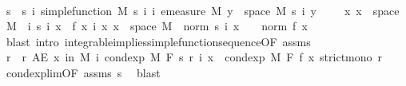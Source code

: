 \begin{isabellebody}
%
\isadelimproof
%
\endisadelimproof
%
\isatagproof
{}\isamarkupfalse%
\ {\isacharminus}{\kern0pt}\isanewline
\ \ \isamarkupfalse%
\ s\ \ s{\isacharcolon}{\kern0pt}\ {\isachardoublequoteopen}{\isasymAnd}i{\isachardot}{\kern0pt}\ simple{\isacharunderscore}{\kern0pt}function\ M\ {\isacharparenleft}{\kern0pt}s\ i{\isacharparenright}{\kern0pt}{\isachardoublequoteclose}\ {\isachardoublequoteopen}{\isasymAnd}i{\isachardot}{\kern0pt}\ emeasure\ M\ {\isacharbraceleft}{\kern0pt}y\ {\isasymin}\ space\ M{\isachardot}{\kern0pt}\ s\ i\ y\ {\isasymnoteq}\ {}{\isacharbraceright}{\kern0pt}\ {\isasymnoteq}\ {\isasyminfinity}{\isachardoublequoteclose}\ {\isachardoublequoteopen}{\isasymAnd}x{\isachardot}{\kern0pt}\ x\ {\isasymin}\ space\ M\ {\isasymLongrightarrow}\ {\isacharparenleft}{\kern0pt}{\isasymlambda}i{\isachardot}{\kern0pt}\ s\ i\ x{\isacharparenright}{\kern0pt}\ {\isasymlonglonglongrightarrow}\ f\ x{\isachardoublequoteclose}\ {\isachardoublequoteopen}{\isasymAnd}i\ x{\isachardot}{\kern0pt}\ x\ {\isasymin}\ space\ M\ {\isasymLongrightarrow}\ norm\ {\isacharparenleft}{\kern0pt}s\ i\ x{\isacharparenright}{\kern0pt}\ {\isasymle}\ {}\ {\isacharasterisk}{\kern0pt}\ norm\ {\isacharparenleft}{\kern0pt}f\ x{\isacharparenright}{\kern0pt}{\isachardoublequoteclose}\ \isanewline
\ \ \ \ \isamarkupfalse%
\ {\isacharparenleft}{\kern0pt}blast\ intro{\isacharcolon}{\kern0pt}\ integrable{\isacharunderscore}{\kern0pt}implies{\isacharunderscore}{\kern0pt}simple{\isacharunderscore}{\kern0pt}function{\isacharunderscore}{\kern0pt}sequence{\isacharbrackleft}{\kern0pt}OF\ assms{\isacharbrackright}{\kern0pt}{\isacharparenright}{\kern0pt}\isanewline
\isanewline
\ \ \isamarkupfalse%
\ r\ \ r{\isacharcolon}{\kern0pt}\ {\isachardoublequoteopen}AE\ x\ in\ M{\isachardot}{\kern0pt}\ {\isacharparenleft}{\kern0pt}{\isasymlambda}i{\isachardot}{\kern0pt}\ cond{\isacharunderscore}{\kern0pt}exp\ M\ F\ {\isacharparenleft}{\kern0pt}s\ {\isacharparenleft}{\kern0pt}r\ i{\isacharparenright}{\kern0pt}{\isacharparenright}{\kern0pt}\ x{\isacharparenright}{\kern0pt}\ {\isasymlonglonglongrightarrow}\ cond{\isacharunderscore}{\kern0pt}exp\ M\ F\ f\ x{\isachardoublequoteclose}\ {\isachardoublequoteopen}strict{\isacharunderscore}{\kern0pt}mono\ r{\isachardoublequoteclose}\ \isamarkupfalse%
\ cond{\isacharunderscore}{\kern0pt}exp{\isacharunderscore}{\kern0pt}lim{\isacharbrackleft}{\kern0pt}OF\ assms\ s{\isacharbrackright}{\kern0pt}\ \isamarkupfalse%
\ blast\isanewline

\end{isabellebody}
